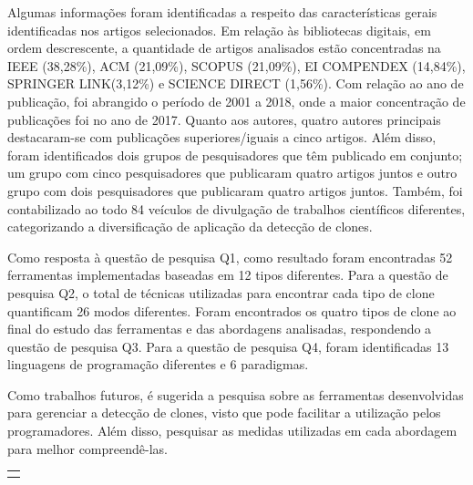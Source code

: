 Algumas informações foram identificadas a respeito das características gerais identificadas nos artigos selecionados. Em relação às bibliotecas digitais, em ordem descrescente, a quantidade de artigos analisados estão concentradas na IEEE (38,28\%), ACM (21,09\%), SCOPUS (21,09\%), EI COMPENDEX (14,84\%), SPRINGER LINK(3,12\%) e SCIENCE DIRECT (1,56\%). Com relação ao ano de publicação, foi abrangido o período de 2001 a 2018, onde a maior concentração de publicações foi no ano de 2017. Quanto aos autores, quatro autores principais destacaram-se com publicações superiores/iguais a cinco artigos. Além disso, foram identificados dois grupos de pesquisadores que têm publicado em conjunto; um grupo com cinco pesquisadores que publicaram quatro artigos juntos e outro grupo com dois pesquisadores que publicaram quatro artigos juntos. Também, foi contabilizado ao todo 84 veículos de divulgação de trabalhos científicos diferentes, categorizando a diversificação de aplicação da detecção de clones.

Como resposta à questão de pesquisa Q1, como resultado foram encontradas 52 ferramentas implementadas baseadas em 12 tipos diferentes. Para a questão de pesquisa Q2, o total de técnicas utilizadas para encontrar cada tipo de clone quantificam 26 modos diferentes. Foram encontrados os quatro tipos de clone ao final do estudo das ferramentas e das abordagens analisadas, respondendo a questão de pesquisa Q3. Para a questão de pesquisa Q4, foram identificadas 13 linguagens de programação diferentes e 6 paradigmas.

Como trabalhos futuros, é sugerida a pesquisa sobre as ferramentas desenvolvidas para gerenciar a detecção de clones, visto que pode facilitar a utilização pelos programadores. Além disso, pesquisar as medidas utilizadas em cada abordagem para melhor compreendê-las. 


\begin{table}[b]
	\begin{flushleft}
		\begin{tabular}{l}
			\textbf{\fontsize{11}{1.5}\selectfont{ANEXO - ARTIGOS IDENTIFICADOS NO ESTUDO EXPLORATÓRIO}}
		\end{tabular}
	\end{flushleft}
\end{table}

